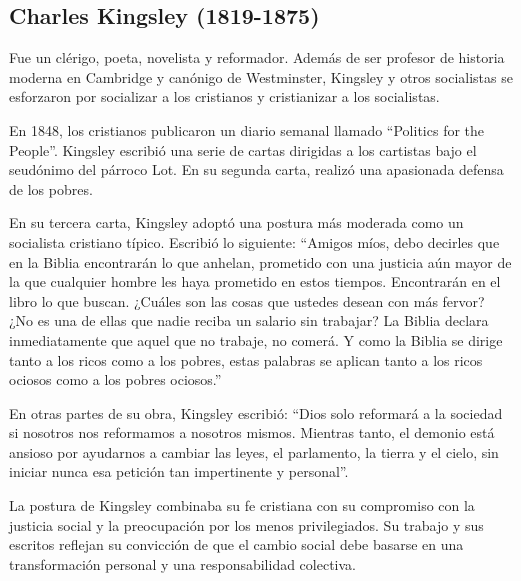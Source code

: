 \documentclass[
  a4paper,
]{article}
\begin{document}
\hypertarget{charles-kingsley-1819-1875}{%
\subsection{Charles Kingsley
(1819-1875)}\label{charles-kingsley-1819-1875}}

Fue un clérigo, poeta, novelista y reformador. Además de ser profesor de
historia moderna en Cambridge y canónigo de Westminster, Kingsley y
otros socialistas se esforzaron por socializar a los cristianos y
cristianizar a los socialistas.

En 1848, los cristianos publicaron un diario semanal llamado ``Politics
for the People''. Kingsley escribió una serie de cartas dirigidas a los
cartistas bajo el seudónimo del párroco Lot. En su segunda carta,
realizó una apasionada defensa de los pobres.

En su tercera carta, Kingsley adoptó una postura más moderada como un
socialista cristiano típico. Escribió lo siguiente: ``Amigos míos, debo
decirles que en la Biblia encontrarán lo que anhelan, prometido con una
justicia aún mayor de la que cualquier hombre les haya prometido en
estos tiempos. Encontrarán en el libro lo que buscan. ¿Cuáles son las
cosas que ustedes desean con más fervor? ¿No es una de ellas que nadie
reciba un salario sin trabajar? La Biblia declara inmediatamente que
aquel que no trabaje, no comerá. Y como la Biblia se dirige tanto a los
ricos como a los pobres, estas palabras se aplican tanto a los ricos
ociosos como a los pobres ociosos.''

En otras partes de su obra, Kingsley escribió: ``Dios solo reformará a
la sociedad si nosotros nos reformamos a nosotros mismos. Mientras
tanto, el demonio está ansioso por ayudarnos a cambiar las leyes, el
parlamento, la tierra y el cielo, sin iniciar nunca esa petición tan
impertinente y personal''.

La postura de Kingsley combinaba su fe cristiana con su compromiso con
la justicia social y la preocupación por los menos privilegiados. Su
trabajo y sus escritos reflejan su convicción de que el cambio social
debe basarse en una transformación personal y una responsabilidad
colectiva.


\printbibliography
\end{document}
